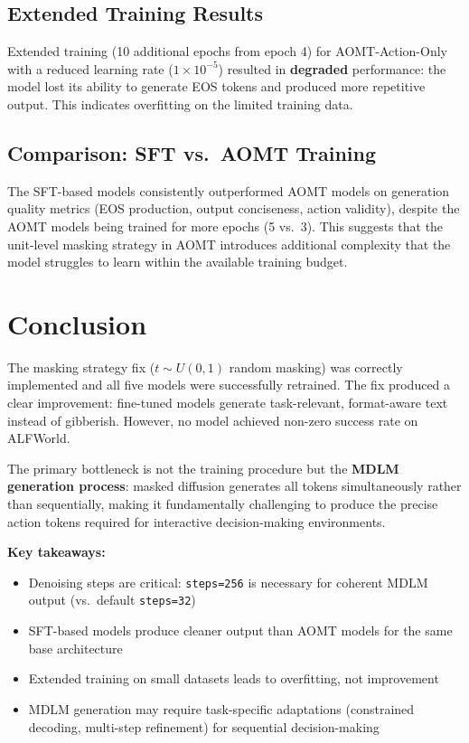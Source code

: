\documentclass[11pt,a4paper]{article}
\begin{document}
\subsection{Extended Training Results}
Extended training (10 additional epochs from epoch 4) for AOMT-Action-Only with a reduced learning rate ($1 \times 10^{-5}$) resulted in \textbf{degraded} performance: the model lost its ability to generate EOS tokens and produced more repetitive output. This indicates overfitting on the limited training data.

\subsection{Comparison: SFT vs.\ AOMT Training}
The SFT-based models consistently outperformed AOMT models on generation quality metrics (EOS production, output conciseness, action validity), despite the AOMT models being trained for more epochs (5 vs.\ 3). This suggests that the unit-level masking strategy in AOMT introduces additional complexity that the model struggles to learn within the available training budget.

\section{Conclusion}

The masking strategy fix ($t \sim U(0,1)$ random masking) was correctly implemented and all five models were successfully retrained. The fix produced a clear improvement: fine-tuned models generate task-relevant, format-aware text instead of gibberish. However, no model achieved non-zero success rate on ALFWorld.

The primary bottleneck is not the training procedure but the \textbf{MDLM generation process}: masked diffusion generates all tokens simultaneously rather than sequentially, making it fundamentally challenging to produce the precise action tokens required for interactive decision-making environments.

\textbf{Key takeaways:}
\begin{itemize}[nosep]
  \item Denoising steps are critical: \texttt{steps=256} is necessary for coherent MDLM output (vs.\ default \texttt{steps=32})
  \item SFT-based models produce cleaner output than AOMT models for the same base architecture
  \item Extended training on small datasets leads to overfitting, not improvement
  \item MDLM generation may require task-specific adaptations (constrained decoding, multi-step refinement) for sequential decision-making
\end{itemize}
\end{document}
